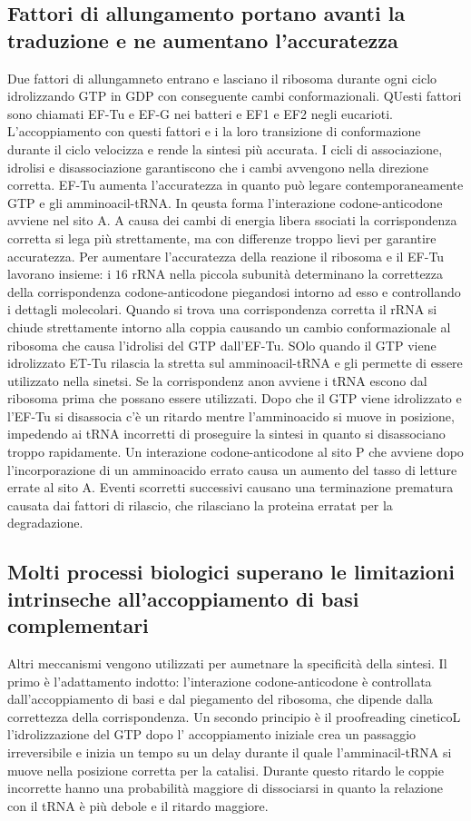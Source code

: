 \subsection{Fattori di allungamento portano avanti la traduzione e ne aumentano l'accuratezza}
Due fattori di allungamneto entrano e lasciano il ribosoma durante ogni ciclo idrolizzando GTP in GDP con conseguente cambi conformazionali. QUesti fattori sono chiamati EF-Tu e EF-G nei
batteri e EF1 e EF2 negli eucarioti. L'accoppiamento con questi fattori e i la loro transizione di conformazione durante il ciclo velocizza e rende la sintesi pi\`u accurata. I cicli di
associazione, idrolisi e disassociazione garantiscono che i cambi avvengono nella direzione corretta. EF-Tu aumenta l'accuratezza in quanto pu\`o legare contemporaneamente GTP e gli 
amminoacil-tRNA. In qeusta forma l'interazione codone-anticodone avviene nel sito A. A causa dei cambi di energia libera ssociati la corrispondenza corretta si lega pi\`u strettamente,
ma con differenze troppo lievi per garantire accuratezza. Per aumentare l'accuratezza della reazione il ribosoma e il EF-Tu lavorano insieme: i $16$ rRNA nella piccola subunit\`a 
determinano la correttezza della corrispondenza codone-anticodone piegandosi intorno ad esso e controllando i dettagli molecolari. Quando si trova una corrispondenza corretta il rRNA
si chiude strettamente intorno alla coppia causando un cambio conformazionale al ribosoma che causa l'idrolisi del GTP dall'EF-Tu. SOlo quando il GTP viene idrolizzato  ET-Tu rilascia 
la stretta sul amminoacil-tRNA e gli permette di essere utilizzato nella sinetsi. Se la corrispondenz anon avviene i tRNA escono dal ribosoma prima che possano essere utilizzati. Dopo
che il GTP viene idrolizzato e l'EF-Tu si disassocia c'\`e un ritardo mentre l'amminoacido si muove in posizione, impedendo ai tRNA incorretti di proseguire la sintesi in quanto si
disassociano troppo rapidamente. Un interazione codone-anticodone al sito P che avviene dopo l'incorporazione di un amminoacido errato causa un aumento del tasso di letture errate al 
sito A. Eventi scorretti successivi causano una terminazione prematura causata dai fattori di rilascio, che rilasciano la proteina erratat per la degradazione. 
\subsection{Molti processi biologici superano le limitazioni intrinseche all'accoppiamento di basi complementari}
Altri meccanismi vengono utilizzati per aumetnare la specificit\`a della sintesi. Il primo \`e l'adattamento indotto: l'interazione codone-anticodone \`e controllata dall'accoppiamento
di basi e dal piegamento del ribosoma, che dipende dalla correttezza della corrispondenza. Un secondo principio \`e il proofreading cineticoL l'idrolizzazione del GTP dopo l'
accoppiamento iniziale crea un passaggio irreversibile e inizia un tempo su un delay durante il quale l'amminacil-tRNA si muove nella posizione corretta per la catalisi. Durante questo
ritardo le coppie incorrette hanno una probabilit\`a maggiore di dissociarsi in quanto la relazione con il tRNA \`e pi\`u debole e il ritardo maggiore. 
